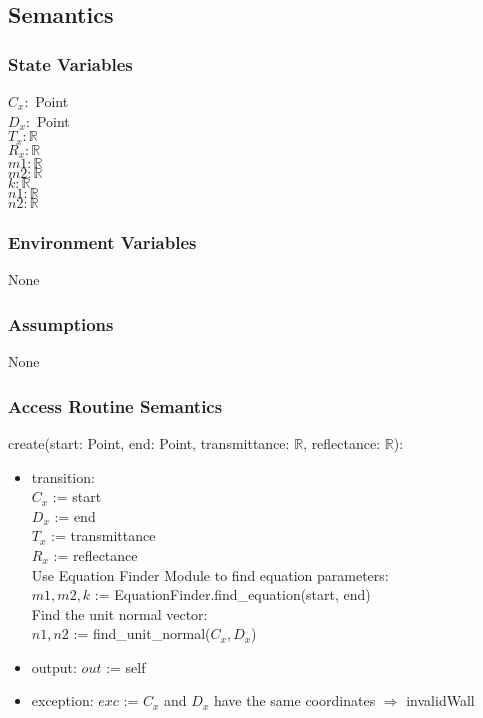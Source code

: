 \documentclass[12pt, titlepage]{article}
\begin{document}
\subsection{Semantics}

\subsubsection{State Variables}
$C_x:$ Point\\
$D_x:$ Point\\
$T_x: \mathbb{R}$\\
$R_x: \mathbb{R}$\\
$m1: \mathbb{R}$\\
$m2: \mathbb{R}$\\
$k: \mathbb{R}$\\
$n1: \mathbb{R}$\\
$n2: \mathbb{R}$

\subsubsection{Environment Variables} None

\subsubsection{Assumptions} None

\subsubsection{Access Routine Semantics}

\noindent create(start: Point, end: Point, transmittance: $\mathbb{R}$, reflectance: $\mathbb{R}$):
\begin{itemize}
\item transition: \\
$C_x$ := start\\
$D_x$ := end\\
$T_x$ := transmittance\\
$R_x$ := reflectance\\

Use Equation Finder Module to find equation parameters:\\
$m1, m2, k$ := EquationFinder.find\_equation(start, end)\\

Find the unit normal vector:\\
$n1, n2$ := find\_unit\_normal($C_x, D_x$)\\
\item output: $out$ := self
\item exception: $exc$ := $C_x$ and $D_x$ have the same coordinates $\Rightarrow$ invalidWall
\end{itemize}
\end{document}
